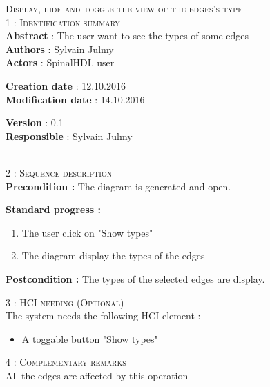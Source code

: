 \begin{flushleft}
    \textsc{\huge Display, hide and toggle the view of the edges's type}\\[0.5cm]

    \BlackLine
    \textsc{\Large 1 : Identification summary}\\[0.3cm]

        \textbf{\large Abstract} : The user want to see the types of some edges\\[0.1cm]

        \textbf{\large Authors} : Sylvain Julmy \\[0.3cm]			

        \textbf{\large Actors} : SpinalHDL user \\[0.1cm]	
    \begin{minipage}{0.40\textwidth}
        \begin{flushleft}	
            \textbf{\large Creation date} : 12.10.2016 \\[0.1cm]

            \textbf{\large Modification date} : 14.10.2016 \\[0.1cm]
        \end{flushleft}
    \end{minipage}
    \begin{minipage}{0.40\textwidth}
        \begin{flushleft}
            \textbf{\large Version} : 0.1 \\[0.1cm]

            \textbf{\large Responsible} : Sylvain Julmy \\[0.1cm]
        \end{flushleft}
    \end{minipage}
    \\[0.5cm]
    \BlackLine
    \textsc{\Large 2 : Sequence description}\\[0.3cm]

    \textbf{\large Precondition :} The diagram is generated and open.

    \textbf{\large  Standard progress :}
    \begin{enumerate}[nosep]
        \item The user click on "Show types"
        \item The diagram display the types of the edges
    \end{enumerate}

    \textbf{\large Postcondition :} The types of the selected edges are display.

    \BlackLine
    \textsc{\Large 3 : HCI needing (Optional)}\\[0.3cm]
    The system needs the following HCI element :
    \begin{itemize}
        \item A toggable button "Show types"
    \end{itemize}

    \BlackLine
    \textsc{\Large 4 : Complementary remarks}\\[0.3cm]

    All the edges are affected by this operation

\end{flushleft}
